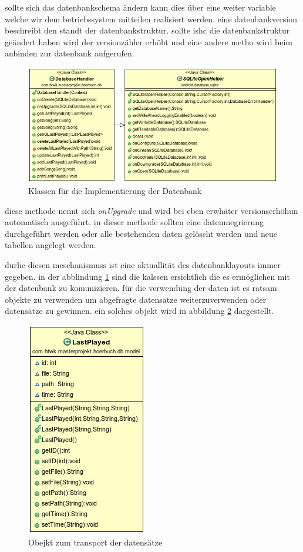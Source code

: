 sollte sich das datenbankschema ändern kann dies über eine weiter variable welche wir dem betriebssystem mitteilen realisiert werden. eine datenbankversion beschreibt den standt der datenbankstruktur. sollte ishc die datenbankstruktur geändert haben wird der versionzähler erhöht und eine andere metho wird beim anbinden zur datenbank aufgerufen.


\begin{figure}
\begin{center}
\includegraphics[scale=0.7]{images/database}
\caption{Klassen für die Implementierung der Datenbank}
\label{database}
\end{center}
\end{figure}


diese methode nennt sich \textit{onUpgrade} und wird bei eben erwhäter versionserhöhun automatisch ausgeführt. in dieser methode sollten eine datenmegrierung durchgeführt werden oder alle bestehenden daten gelöscht werden und neue tabellen angelegt werden.

durhc diesen meschanismuss ist eine aktuallität des datenbanklayouts immer gegeben. in der abblindung \ref{database} sind die kalssen ersichtlich die es ermöglichen mit der datenbank zu komunizieren. für die verwendung der daten ist es ratsam objekte zu verwenden um abgefragte datensatze weiterzuverwenden oder datensätze zu gewinnen. ein solches objekt wird in abbildung \ref{dbmodel} dargestellt.

\begin{figure}
\begin{center}
\includegraphics[scale=0.7]{images/dbmodel}
\caption{Obejkt zum transport der datensätze}
\label{dbmodel}
\end{center}
\end{figure}

